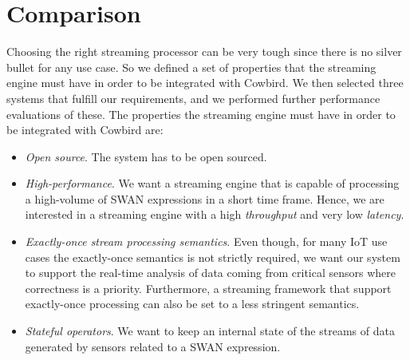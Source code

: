 \section{Comparison}
Choosing the right streaming processor can be very tough since there is no silver bullet for any use case. %
So we defined a set of properties that the streaming engine must have in order to be integrated with Cowbird. We then selected three systems that fulfill our requirements, and we performed further performance evaluations of these. The properties the streaming engine must have in order to be integrated with Cowbird are:
\begin{itemize}
\item \emph{Open source}. The system has to be open sourced.
\item \emph{High-performance}. We want a streaming engine that is capable of processing a high-volume of SWAN expressions in a short time frame. Hence, we are interested in a streaming engine with a high \emph{throughput} and very low \emph{latency}.
\item \emph{Exactly-once stream processing semantics}. Even though, for many IoT use cases the exactly-once semantics is not strictly required, we want our system to support the real-time analysis of data coming from critical sensors where correctness is a priority. Furthermore, a streaming framework that support exactly-once processing can also be set to a less stringent semantics. 
\item \emph{Stateful operators}. We want to keep an internal state of the streams of data generated by sensors related to a SWAN expression.
\end{itemize}

